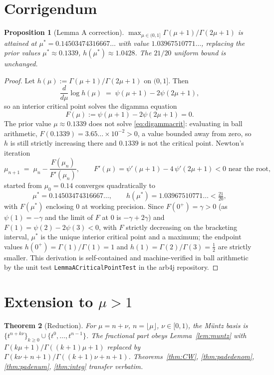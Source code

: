 \documentclass[11pt]{article}
\newtheorem{theorem}{Theorem}[section]
\newtheorem{proposition}[theorem]{Proposition}
\theoremstyle{definition}
\begin{document}
\section{Corrigendum}

\begin{proposition}[Lemma A correction]\label{prop:corrig}
$\max_{\mu \in (0,1]} \Gamma(\mu+1)/\Gamma(2\mu+1)$ is attained at
$\mu^{*} = 0.14503474316667\ldots$ with value
$1.03967510771\ldots$, replacing the prior values
$\mu^{*}\approx 0.1339$, $h(\mu^{*})\approx 1.0428$. The $21/20$
uniform bound is unchanged.
\end{proposition}

\begin{proof}
Let $h(\mu) := \Gamma(\mu+1)/\Gamma(2\mu+1)$ on $(0,1]$. Then
\[
\frac{d}{d\mu} \log h(\mu) \;=\; \psi(\mu+1) - 2\psi(2\mu+1),
\]
so an interior critical point solves the digamma equation
\begin{equation}\label{eq:digammacrit}
F(\mu) := \psi(\mu+1) - 2\psi(2\mu+1) = 0 .
\end{equation}
The prior value $\mu \approx 0.1339$ does not solve
\eqref{eq:digammacrit}: evaluating in ball arithmetic,
$F(0.1339) = 3.65\ldots \times 10^{-2} > 0$, a value bounded away
from zero, so $h$ is still strictly increasing there and $0.1339$ is
not the critical point. Newton's iteration
\[
\mu_{n+1} \;=\; \mu_{n} - \frac{F(\mu_{n})}{F'(\mu_{n})},
\qquad
F'(\mu) = \psi'(\mu+1) - 4\,\psi'(2\mu+1) < 0 \text{ near the root},
\]
started from $\mu_{0} = 0.14$ converges quadratically to
\[
\mu^{*} = 0.14503474316667\ldots,
\qquad
h(\mu^{*}) = 1.03967510771\ldots < \tfrac{21}{20},
\]
with $F(\mu^{*})$ enclosing $0$ at working precision. Since
$F(0^{+}) = \gamma > 0$ (as $\psi(1) = -\gamma$ and the limit of $F$
at $0$ is $-\gamma + 2\gamma$) and $F(1) = \psi(2) - 2\psi(3) < 0$,
with $F$ strictly decreasing on the bracketing interval, $\mu^{*}$ is
the unique interior critical point and a maximum; the endpoint values
$h(0^{+}) = \Gamma(1)/\Gamma(1) = 1$ and
$h(1) = \Gamma(2)/\Gamma(3) = \tfrac{1}{2}$ are strictly smaller. This
derivation is
self-contained and machine-verified in ball arithmetic by the unit
test \texttt{LemmaACriticalPointTest} in the arb4j repository.
\end{proof}

\section{Extension to $\mu>1$}

\begin{theorem}[Reduction]\label{thm:munugt1}
For $\mu = n+\nu$, $n=\lfloor\mu\rfloor$, $\nu \in [0,1)$, the
M\"untz basis is $\{t^{n+k\nu}\}_{k\geq 0} \cup \{t^{0},\ldots,t^{n-1}\}$.
The fractional part obeys Lemma~\ref{lem:muntz} with
$\Gamma(k\mu+1)/\Gamma((k+1)\mu+1)$ replaced by
$\Gamma(k\nu+n+1)/\Gamma((k+1)\nu+n+1)$. Theorems~\ref{thm:CW},
\ref{thm:padedenom}, \ref{thm:padenum}, \ref{thm:integ} transfer
verbatim.
\end{theorem}
\end{document}
